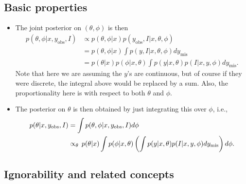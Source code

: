 \documentclass[12pt]{article}
\begin{document}
\subsection{Basic properties}
\begin{itemize}
\item The joint posterior on $(\theta,\phi)$ is then
\begin{align*}
p(\theta,\phi | x,y_\text{obs},I) & \propto p(\theta,\phi | x) p(y_\text{obs},I | x,\theta,\phi)\\
& = p(\theta,\phi | x) \int p(y,I | x,\theta,\phi) d y_\text{mis}\\
&= p(\theta | x) p(\phi | x,\theta) \int p(y | x,\theta) p(I | x,y,\phi) d y_\text{mis}.
\end{align*}
Note that here we are assuming the $y$'s are continuous, but of course if they were discrete, the integral above would be replaced by a sum. Also, the proportionality here is with respect to both $\theta$ and $\phi$.
\item The posterior on $\theta$ is then obtained by just integrating this over $\phi$, i.e.,
\begin{align} \label{equation:posterior}
p(\theta | x,y_\text{obs},I) & = \int p(\theta,\phi | x,y_\text{obs},I) d \phi\notag\\
& \propto_\theta \,p(\theta | x) \int p(\phi | x,\theta) \left(\int p(y | x,\theta) p(I | x,y,\phi) d y_\text{mis} \right) d\phi.
\end{align}
\end{itemize}

\subsection{Ignorability and related concepts}
\end{document}
